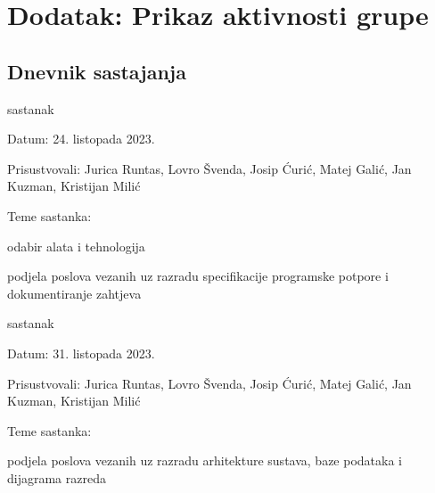 \chapter*{Dodatak: Prikaz aktivnosti grupe}
		
		\section*{Dnevnik sastajanja}
		
		
		\begin{packed_enum}
			\item  sastanak
			
			\item[] \begin{packed_item}
				\item Datum: 24. listopada 2023.
				\item Prisustvovali: Jurica Runtas, Lovro Švenda, Josip Ćurić,
				Matej Galić, Jan Kuzman, Kristijan Milić
				\item Teme sastanka:
				\begin{packed_item}
					\item  odabir alata i tehnologija
					\item  podjela poslova vezanih uz razradu specifikacije programske potpore i dokumentiranje zahtjeva
				\end{packed_item}
			\end{packed_item}
		
			\item sastanak
			\item[] \begin{packed_item}
			\item Datum: 31. listopada 2023.
			\item Prisustvovali: Jurica Runtas, Lovro Švenda, Josip Ćurić,
			Matej Galić, Jan Kuzman, Kristijan Milić
			\item Teme sastanka:
			\begin{packed_item}
				\item  podjela poslova vezanih uz razradu arhitekture sustava, baze podataka i dijagrama razreda
			\end{packed_item}
			\end{packed_item}
	

\end{packed_enum}
